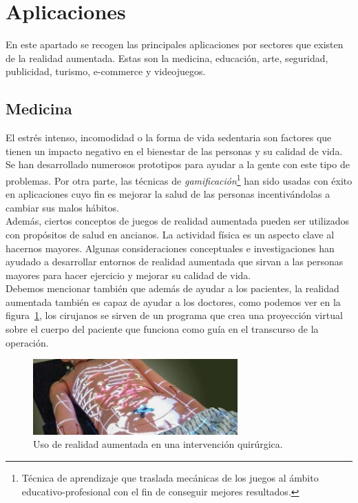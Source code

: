 \section{Aplicaciones}

En este apartado se recogen las principales aplicaciones por sectores que existen de la realidad aumentada. Estas son la medicina, educación, arte, seguridad, publicidad, turismo, e-commerce y videojuegos.\\
\subsection{Medicina}
El estrés intenso, incomodidad o la forma de vida sedentaria son factores que tienen un impacto negativo en el bienestar de las personas y su calidad de vida. Se han desarrollado numerosos prototipos para ayudar a la gente con este tipo de problemas. Por otra parte, las técnicas de \textit{gamificación}\footnote{ Técnica de aprendizaje que traslada mecánicas de los juegos al ámbito educativo-profesional con el fin de conseguir mejores resultados.} han sido usadas con éxito en aplicaciones cuyo fin es mejorar la salud de las personas incentivándolas a cambiar sus malos hábitos.\\

Además, ciertos conceptos de juegos de realidad aumentada pueden ser utilizados con propósitos de salud en ancianos. La actividad física es un aspecto clave al hacernos mayores. Algunas consideraciones conceptuales e investigaciones han ayudado a desarrollar entornos de realidad aumentada que sirvan a las personas mayores para hacer ejercicio y mejorar su calidad de vida.\\

Debemos mencionar también que además de ayudar a los pacientes, la realidad aumentada también es capaz de ayudar a los doctores, como podemos ver en la figura~\ref{fig:Surgeon}, los cirujanos se sirven de un programa que crea una proyección virtual sobre el cuerpo del paciente que funciona como guía en el transcurso de la operación.

\begin{figure}[H]
     \centering
     \includegraphics[width=0.7\textwidth]{Images/medicina_AR.jpg}
     \caption[Uso de realidad aumentada en una intervención quirúrgica]{Uso de realidad aumentada en una intervención quirúrgica\footnotemark.}
     \label{fig:Surgeon}
 \end{figure}

